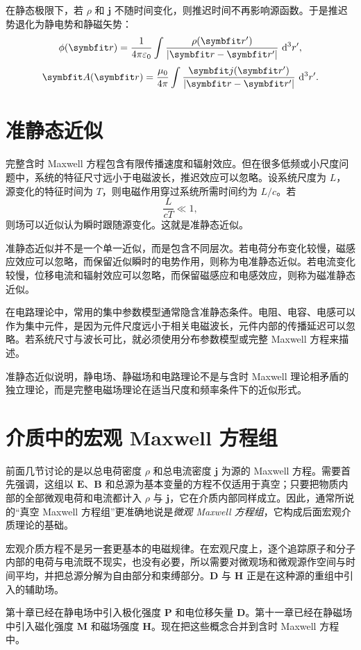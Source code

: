 在静态极限下，若 $\rho$ 和 $\bm{j}$ 不随时间变化，则推迟时间不再影响源函数。于是推迟势退化为静电势和静磁矢势：
\[
\phi(\bm{r})
=
\frac{1}{4\pi\varepsilon_{0}}
\int
\frac{\rho(\bm{r}')}{|\bm{r}-\bm{r}'|}
\,\dif^{3}r',
\]
\[
\bm{A}(\bm{r})
=
\frac{\mu_{0}}{4\pi}
\int
\frac{\bm{j}(\bm{r}')}{|\bm{r}-\bm{r}'|}
\,\dif^{3}r'.
\]

\section{准静态近似}

完整含时 Maxwell 方程包含有限传播速度和辐射效应。但在很多低频或小尺度问题中，系统的特征尺寸远小于电磁波长，推迟效应可以忽略。设系统尺度为 $L$，源变化的特征时间为 $T$，则电磁作用穿过系统所需时间约为 $L/c$。若
\[
\frac{L}{cT}\ll 1,
\]
则场可以近似认为瞬时跟随源变化。这就是准静态近似。

准静态近似并不是一个单一近似，而是包含不同层次。若电荷分布变化较慢，磁感应效应可以忽略，而保留近似瞬时的电势作用，则称为电准静态近似。若电流变化较慢，位移电流和辐射效应可以忽略，而保留磁感应和电感效应，则称为磁准静态近似。

在电路理论中，常用的集中参数模型通常隐含准静态条件。电阻、电容、电感可以作为集中元件，是因为元件尺度远小于相关电磁波长，元件内部的传播延迟可以忽略。若系统尺寸与波长可比，就必须使用分布参数模型或完整 Maxwell 方程来描述。

准静态近似说明，静电场、静磁场和电路理论不是与含时 Maxwell 理论相矛盾的独立理论，而是完整电磁场理论在适当尺度和频率条件下的近似形式。


\section{介质中的宏观 Maxwell 方程组}

前面几节讨论的是以总电荷密度 $\rho$ 和总电流密度 $\bm{j}$ 为源的 Maxwell 方程。需要首先强调，这组以 $\bm{E}$、$\bm{B}$ 和总源为基本变量的方程不仅适用于真空；只要把物质内部的全部微观电荷和电流都计入 $\rho$ 与 $\bm{j}$，它在介质内部同样成立。因此，通常所说的“真空 Maxwell 方程组”更准确地说是\emph{微观 Maxwell 方程组}，它构成后面宏观介质理论的基础。

宏观介质方程不是另一套更基本的电磁规律。在宏观尺度上，逐个追踪原子和分子内部的电荷与电流既不现实，也没有必要，所以需要对微观场和微观源作空间与时间平均，并把总源分解为自由部分和束缚部分。$\bm{D}$ 与 $\bm{H}$ 正是在这种源的重组中引入的辅助场。

第十章已经在静电场中引入极化强度 $\bm{P}$ 和电位移矢量 $\bm{D}$。第十一章已经在静磁场中引入磁化强度 $\bm{M}$ 和磁场强度 $\bm{H}$。现在把这些概念合并到含时 Maxwell 方程中。

